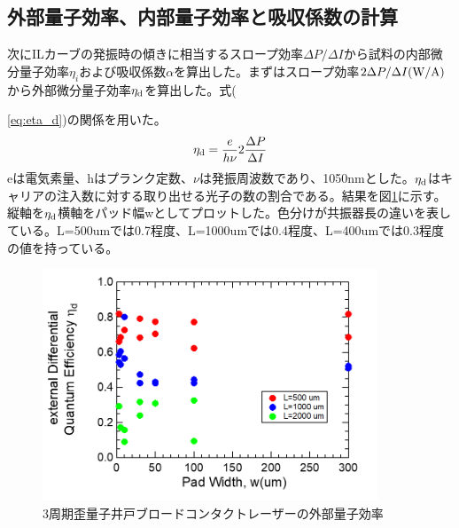 \subsection{外部量子効率、内部量子効率と吸収係数の計算}%
次にILカーブの発振時の傾きに相当するスロープ効率$\Delta P/\Delta I$から試料の内部微分量子効率$\eta_{i}$および吸収係数$\alpha$を算出した。まずはスロープ効率$2 \Delta P/\Delta I \rm{(W/A)}$から外部微分量子効率$\eta_{\rm{d}}$を算出した。式({\ref{eq:eta_d})の関係を用いた。
\begin{eqnarray}
\eta_{\rm{d}}=\dfrac{e}{h\nu}2\dfrac{\Delta P}{\Delta I} 
\label{eq:eta_d}
\end{eqnarray}
eは電気素量、hはプランク定数、$\nu$は発振周波数であり、1050nmとした。$\eta_{\rm{d}}$はキャリアの注入数に対する取り出せる光子の数の割合である。結果を図\ref{fig:fig_3_1_3QW_broadcontact_id}に示す。縦軸を$\eta_{\rm{d}}$横軸をパッド幅wとしてプロットした。色分けが共振器長の違いを表している。L=500umでは0.7程度、L=1000umでは0.4程度、L=400umでは0.3程度の値を持っている。
\begin{figure}[h]
	\centering
	\includegraphics[width=10cm]{figure/fig_3_1_3QW_broadcontact_id.png}
	\caption{3周期歪量子井戸ブロードコンタクトレーザーの外部量子効率}
	\label{fig:fig_3_1_3QW_broadcontact_id}
\end{figure}


}
